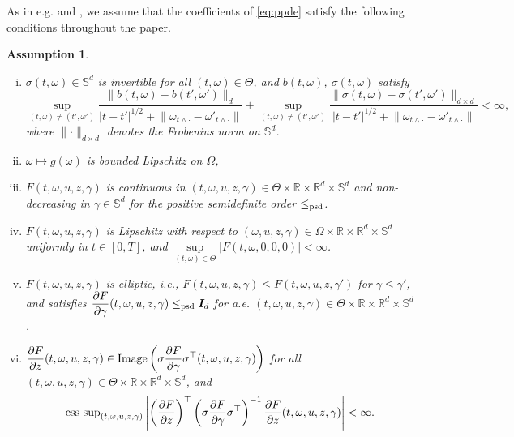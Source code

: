\documentclass[12pt]{article}
\newtheorem{assumption}{Assumption}
\numberwithin{equation}{section}
\newcommand{\abs}[1]{\lvert#1\rvert}
\newcommand{\norm}[1]{\lVert#1\rVert}
\def\esssup{{\mathrm{ess~{\rm sup}}}}
\newcommand{\real}{\mathbb{R}}
\let\oldcitet=\citet
\renewcommand{\cite}[1]{\textcolor[rgb]{0,0,1}{\oldcitet{#1}}}
\renewcommand{\citet}[1]{\textcolor[rgb]{0,0,1}{\oldcitet{#1}}}
\begin{document}
\noindent
As in e.g.
\cite{ren2017convergence} and
\cite{fahim},
we assume that the coefficients of
\eqref{eq:ppde}
 satisfy the following conditions
throughout the paper.
\begin{assumption}
\label{basic assumptions}
\begin{enumerate}[i)]
\item $\sigma (t, \omega) \in \mathbb{S}^d$ is invertible
  for all $(t, \omega)\in \Theta$, and
		$b(t, \omega)$, $\sigma (t, \omega)$ satisfy
		\begin{equation*}
			\sup\limits_{(t, \omega) \neq (t', \omega')}
			\frac{\norm{b(t, \omega) - b(t', \omega')}_d}
			{\abs{t-t'}^{1/2} + \norm{\omega_{t \land \cdot}
				- \omega'_{t \land \cdot}}}
			+ \sup\limits_{(t, \omega) \neq (t', \omega')}
            \frac{\norm{\sigma(t, \omega) - \sigma(t', \omega')}_{d\times d}}
			{\abs{t-t'}^{1/2} + \norm{\omega_{t \land \cdot}
				- \omega'_{t \land \cdot}}}
			< \infty,
		\end{equation*}
  where
  $\norm{ \cdot }_{d\times d}$ denotes the Frobenius norm on $\mathbb{S}^d$.
	      \item
                \label{part2}
                $\omega \mapsto g(\omega)$ is bounded Lipschitz on $\Omega$,
	\item $F(t, \omega, u, z, \gamma)$ is
	  continuous in $(t, \omega, u, z, \gamma)\in \Theta \times \real \times \real^d \times \mathbb{S}^d$ and
	  non-decreasing in $\gamma \in \mathbb{S}^d$
          for the positive semidefinite order $\leq_{\rm psd}$.
	\item
          \label{aaa}
          $F (t, \omega, u, z, \gamma)$ is
	  Lipschitz with respect to $(\omega, u, z, \gamma)
          \in \Omega \times \real \times \real^d \times \mathbb{S}^d$
		uniformly in $t \in [0,T]$, and
		$\sup\limits_{(t, \omega) \in \Theta}
		\abs{F(t, \omega, 0, 0, 0)} < \infty$.
	      \item $F(t, \omega, u, z, \gamma)$ is elliptic,
                i.e., $F(t, \omega, u, z, \gamma) \leq F(t, \omega, u, z, \gamma ')$
                for $\gamma \leq \gamma'$,
                and
		satisfies
                $\displaystyle \frac{\partial F}{\partial \gamma} (t, \omega, u, z, \gamma)\leq_{\rm psd} \bm{I}_d$
		for a.e. $(t, \omega, u, z, \gamma)\in \Theta \times \real \times \real^d \times \mathbb{S}^d$.
	      \item $\displaystyle
                \frac{\partial F}{\partial z} (t, \omega, u, z, \gamma) \in
		     {\rm Image} \left(\sigma
                     \frac{\partial F}{\partial \gamma} \sigma^\top (t, \omega, u, z, \gamma)\right)$
                for all
		$(t, \omega, u, z, \gamma) \in
                \Theta \times \real \times \real^d \times \mathbb{S}^d$, and
		$$
                \esssup_{(t, \omega, u, z, \gamma)}
		\left| \left(\frac{\partial F}{\partial z} \right)^\top
		\left(\sigma \frac{\partial F}{\partial \gamma} \sigma^\top\right)^{-1}
		  \frac{\partial F}{\partial z} (t, \omega, u, z, \gamma)\right| < \infty.
                $$
\end{enumerate}
\end{assumption}
\end{document}
